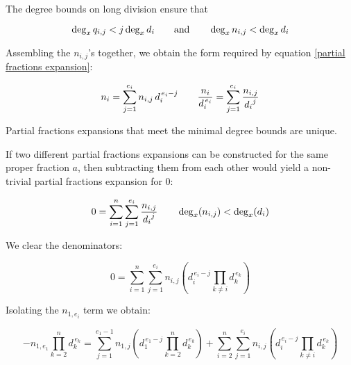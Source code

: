 The degree bounds on long division ensure that

\begin{equation*}
\deg_x q_{i,j} < j \deg_x d_i  \qquad  {\rm and} \qquad \deg_x n_{i,j} < \deg_x d_i
\end{equation*}

Assembling the $n_{i,j}$'s together, we obtain the form
required by equation \eqref{partial fractions expansion}:


\begin{equation*}
n_i = \sum_{j=1}^{e_i} n_{i,j}\, d_i^{\,e_i-j} \qquad
{{n_i}\over{d_i^{\,e_i}}} = \sum_{j=1}^{e_i} {n_{i,j}\over {d_i}^j}
\end{equation*}

\theorem
Partial fractions expansions that meet the minimal degree bounds are unique.

\proof

If two different partial fractions expansions can be constructed for
the same proper fraction $a$, then subtracting them from each other
would yield a non-trivial partial fractions expansion for $0$:

\begin{equation}
0=\sum_{i=1}^{n}\sum_{j=1}^{e_i} {n_{i,j}\over {d_i}^j}
\qquad \deg_x (n_{i,j}) < \deg_x (d_i)
\end{equation}

We clear the denominators:

\begin{equation}
0 =\sum_{i=1}^{n}\sum_{j=1}^{e_i} n_{i,j} \left( d_i^{\,e_i-j} \prod_{k \ne i} d_k^{\,e_k} \right)
\end{equation}

Isolating the $n_{1,e_i}$ term we obtain:

\begin{equation}
-n_{1,e_1}\prod_{k = 2}^{n} d_{k}^{\,e_k}=\sum_{j=1}^{e_1-1} n_{1,j} \left( d_1^{\,e_1-j} \prod_{k =2}^n d_k^{\,e_k} \right)
+ \sum_{i=2}^{n}\sum_{j=1}^{e_i} n_{i,j} \left( d_i^{\,e_i-j} \prod_{k \ne i} d_k^{\,e_k} \right)
\end{equation}


